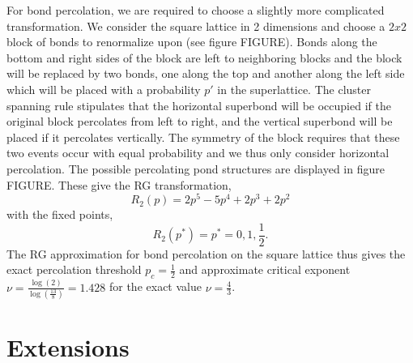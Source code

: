 For bond percolation, we are required to choose a slightly more complicated
transformation.  We consider the square lattice in 2 dimensions and choose
a $2x2$ block of bonds to renormalize upon (see figure FIGURE).  Bonds along the bottom and right sides
of the block are left to neighboring blocks and the block will be replaced by
two bonds, one along the top and another along the left side which will be
placed with a probability $p'$ in the superlattice.  The cluster spanning rule
stipulates that the horizontal superbond will be occupied if the original
block percolates from left to right, and the vertical superbond will be placed
if it percolates vertically.  The symmetry of the block requires that these
two events occur with equal probability and we thus only consider
horizontal percolation.  The possible percolating pond structures are displayed
in figure FIGURE.  These give the RG transformation,
\[R_2(p) = 2p^5 - 5p^4 + 2p^3 + 2p^2\]
with the fixed points,
\[R_2(p^*) = p^* = 0, 1, \frac{1}{2}.\]
The RG approximation for bond percolation on the square lattice thus gives
the exact percolation threshold $p_c = \frac{1}{2}$ and approximate 
critical exponent $\nu = \frac{\log(2)}{\log(\frac{13}{8})} = 1.428$ for
the exact value $\nu=\frac{4}{3}$.

\section{Extensions}


